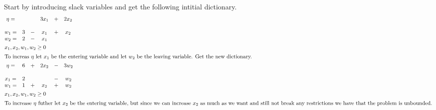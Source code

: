 \documentclass{article}
\begin{document}
Start by introducing slack variables and get the following intitial dictionary.
\begin{align*}
  &\begin{matrix}
     \eta = & & & 3x_1& + &2x_2 \\
     \\
     w_1 = & 3 & - & x_1& + &x_2  \\
     w_2 = & 2 & -&x_1 & & \\
   \end{matrix} \\
  &x_1, x_2, w_1, w_2 \geq 0 \\
  \intertext{To increas $\eta$ let $x_1$ be the entering variable and let $w_2$ be the leaving variable. Get the new dictionary.}
  &\begin{matrix}
     \eta = &6 & + & 2x_2& - &3w_2 \\
     \\
     x_1 = & 2 & & & -&w_2 \\
     w_1 = & 1 & + & x_2& + &w_2  \\
   \end{matrix} \\
  &x_1, x_2, w_1, w_2 \geq 0 \\
  \intertext{To increase $\eta$ futher let $x_2$ be the entering variable, but since we can increase $x_2$ as much as we want and still not break any restrictions we have that the problem is unbounded.}
\end{align*}
\end{document}
